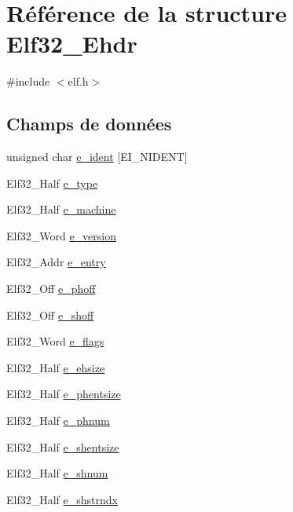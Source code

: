 \hypertarget{structElf32__Ehdr}{\section{Référence de la structure Elf32\-\_\-\-Ehdr}
\label{structElf32__Ehdr}
}


{\ttfamily \#include $<$elf.\-h$>$}

\subsection*{Champs de données}
\begin{DoxyCompactItemize}
\item 
unsigned char \hyperlink{structElf32__Ehdr_aba47ac5e0af02d5668782f1fd5a7466c}{e\-\_\-ident} \mbox{[}E\-I\-\_\-\-N\-I\-D\-E\-N\-T\mbox{]}
\item 
Elf32\-\_\-\-Half \hyperlink{structElf32__Ehdr_a49e40a791813c06e3b6ebcb53aef1bb8}{e\-\_\-type}
\item 
Elf32\-\_\-\-Half \hyperlink{structElf32__Ehdr_a19bca7faba9e5573814643efc3574c7b}{e\-\_\-machine}
\item 
Elf32\-\_\-\-Word \hyperlink{structElf32__Ehdr_aa27627bda53281221325df4dd782e800}{e\-\_\-version}
\item 
Elf32\-\_\-\-Addr \hyperlink{structElf32__Ehdr_ab8a982696048d807017919b7d0145482}{e\-\_\-entry}
\item 
Elf32\-\_\-\-Off \hyperlink{structElf32__Ehdr_a25c36fc010284a928604aae005b67ad1}{e\-\_\-phoff}
\item 
Elf32\-\_\-\-Off \hyperlink{structElf32__Ehdr_a00601af5187a1b3f8babfe9cddd95c15}{e\-\_\-shoff}
\item 
Elf32\-\_\-\-Word \hyperlink{structElf32__Ehdr_a87cf481be7917fafde0c4ecf78c8e574}{e\-\_\-flags}
\item 
Elf32\-\_\-\-Half \hyperlink{structElf32__Ehdr_a04c658023e50479eed64f6d1b00a2504}{e\-\_\-ehsize}
\item 
Elf32\-\_\-\-Half \hyperlink{structElf32__Ehdr_afa2289f96d86fcc568a3b1f40cc8953e}{e\-\_\-phentsize}
\item 
Elf32\-\_\-\-Half \hyperlink{structElf32__Ehdr_a360898812db1655f8cb8258780d9df5b}{e\-\_\-phnum}
\item 
Elf32\-\_\-\-Half \hyperlink{structElf32__Ehdr_ab53c709a841960e499da68e2316ed428}{e\-\_\-shentsize}
\item 
Elf32\-\_\-\-Half \hyperlink{structElf32__Ehdr_a11249bd7e61642742a68a3e7f69ac721}{e\-\_\-shnum}
\item 
Elf32\-\_\-\-Half \hyperlink{structElf32__Ehdr_a3b3070ccd7d971e8cb6ea58d4c6fab09}{e\-\_\-shstrndx}
\end{DoxyCompactItemize}


